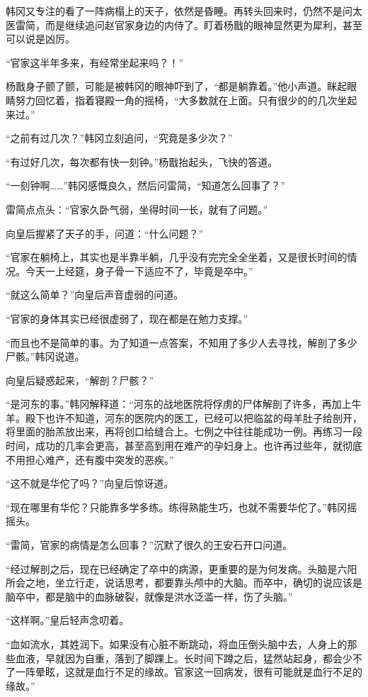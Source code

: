 韩冈又专注的看了一阵病榻上的天子，依然是昏睡。再转头回来时，仍然不是问太医雷简，而是继续追问赵官家身边的内侍了。盯着杨戬的眼神显然更为犀利，甚至可以说是凶厉。

“官家这半年多来，有经常坐起来吗？！”

杨戬身子颤了颤，可能是被韩冈的眼神吓到了，“都是躺靠着。”他小声道。眯起眼睛努力回忆着，指着寝殿一角的摇椅，“大多数就在上面。只有很少的的几次坐起来过。”

“之前有过几次？”韩冈立刻追问，“究竟是多少次？”

“有过好几次，每次都有快一刻钟。”杨戬抬起头，飞快的答道。

“一刻钟啊……”韩冈感慨良久，然后问雷简，“知道怎么回事了？”

雷简点点头：“官家久卧气弱，坐得时间一长，就有了问题。”

向皇后握紧了天子的手，问道：“什么问题？”

“官家在躺椅上，其实也是半靠半躺，几乎没有完完全全坐着，又是很长时间的情况。今天一上经筵，身子骨一下适应不了，毕竟是卒中。”

“就这么简单？”向皇后声音虚弱的问道。

“官家的身体其实已经很虚弱了，现在都是在勉力支撑。”

“而且也不是简单的事。为了知道一点答案，不知用了多少人去寻找，解剖了多少尸骸。”韩冈说道。

向皇后疑惑起来，“解剖？尸骸？”

“是河东的事。”韩冈解释道：“河东的战地医院将俘虏的尸体解剖了许多，再加上牛羊。殿下也许不知道，河东的医院内的医工，已经可以把临盆的母羊肚子给剖开，将里面的胎羔放出来，再将创口给缝合上。七例之中往往能成功一例。再练习一段时间，成功的几率会更高，甚至高到用在难产的孕妇身上。也许再过些年，就彻底不用担心难产，还有腹中突发的恶疾。”

“这不就是华佗了吗？”向皇后惊讶道。

“现在哪里有华佗？只能靠多学多练。练得熟能生巧，也就不需要华佗了。”韩冈摇摇头。

“雷简，官家的病情是怎么回事？”沉默了很久的王安石开口问道。

“经过解剖之后，现在已经确定了卒中的病源，更重要的是为何发病。头脑是六阳所会之地，坐立行走，说话思考，都要靠头颅中的大脑。而卒中，确切的说应该是脑卒中，都是脑中的血脉破裂，就像是洪水泛滥一样，伤了头脑。”

“这样啊。”皇后轻声念叨着。

“血如流水，其姓润下。如果没有心脏不断跳动，将血压倒头脑中去，人身上的那些血液，早就因为自重，落到了脚踝上。长时间下蹲之后，猛然站起身，都会少不了一阵晕眩，这就是血行不足的缘故。官家这一回病发，很有可能就是血行不足的缘故。”

